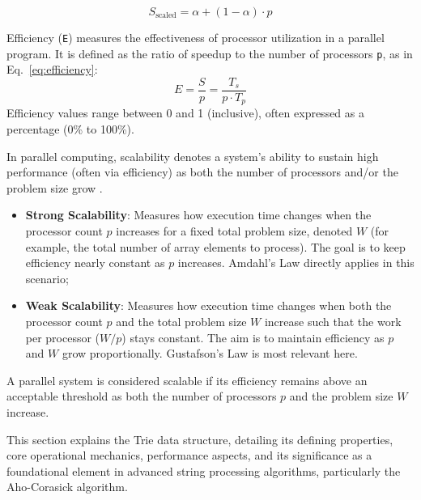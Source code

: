 \begin{equation}
    S_{\text{scaled}} = \alpha + (1-\alpha) \cdot p
    \label{eq:gustafson}
\end{equation}


Efficiency (\texttt{E}) measures the effectiveness of processor utilization in a parallel program. It is defined as the ratio of speedup to the number of processors \texttt{p}, as in Eq.~\ref{eq:efficiency}:
\begin{equation}
    E = \frac{S}{p} = \frac{T_s}{p \cdot T_p}
    \label{eq:efficiency}
\end{equation}
Efficiency values range between 0 and 1 (inclusive), often expressed as a percentage (0\% to 100\%).



In parallel computing, scalability denotes a system’s ability to sustain high performance (often via efficiency) as both the number of processors and/or the problem size grow \cite{Grama2003}.

\begin{itemize}
    \item \textbf{Strong Scalability}: Measures how execution time changes when the processor count $p$ increases for a fixed total problem size, denoted $W$ (for example, the total number of array elements to process). The goal is to keep efficiency nearly constant as $p$ increases. Amdahl’s Law directly applies in this scenario;
    \item \textbf{Weak Scalability}: Measures how execution time changes when both the processor count $p$ and the total problem size $W$ increase such that the work per processor ($W/p$) stays constant. The aim is to maintain efficiency as $p$ and $W$ grow proportionally. Gustafson’s Law is most relevant here.
\end{itemize}

A parallel system is considered scalable if its efficiency remains above an acceptable threshold as both the number of processors $p$ and the problem size $W$ increase.



This section explains the Trie data structure, detailing its defining properties, core operational mechanics, performance aspects, and its significance as a foundational element in advanced string processing algorithms, particularly the Aho-Corasick algorithm.


